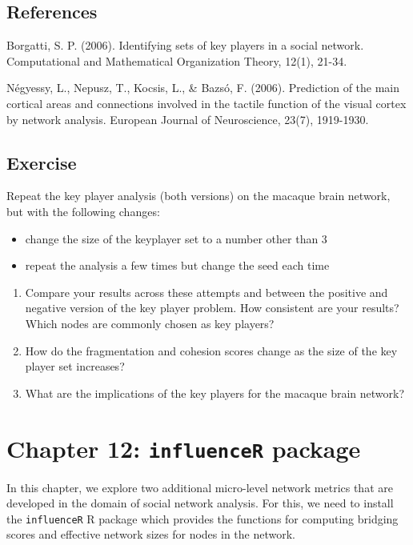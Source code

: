 \documentclass[
]{book}
\providecommand{\tightlist}{%
  \setlength{\itemsep}{0pt}\setlength{\parskip}{0pt}}
\begin{document}
\section{References}\label{references-1}

Borgatti, S. P. (2006). Identifying sets of key players in a social network. Computational and Mathematical Organization Theory, 12(1), 21-34.

Négyessy, L., Nepusz, T., Kocsis, L., \& Bazsó, F. (2006). Prediction of the main cortical areas and connections involved in the tactile function of the visual cortex by network analysis. European Journal of Neuroscience, 23(7), 1919-1930.

\section{Exercise}\label{exercise-7}

Repeat the key player analysis (both versions) on the macaque brain network, but with the following changes:

\begin{itemize}
\tightlist
\item
  change the size of the keyplayer set to a number other than 3
\item
  repeat the analysis a few times but change the seed each time
\end{itemize}

\begin{enumerate}
\def\labelenumi{\arabic{enumi}.}
\tightlist
\item
  Compare your results across these attempts and between the positive and negative version of the key player problem. How consistent are your results? Which nodes are commonly chosen as key players?
\item
  How do the fragmentation and cohesion scores change as the size of the key player set increases?
\item
  What are the implications of the key players for the macaque brain network?
\end{enumerate}

\chapter{\texorpdfstring{Chapter 12: \texttt{influenceR} package}{Chapter 12: influenceR package}}\label{ch12}

In this chapter, we explore two additional micro-level network metrics that are developed in the domain of social network analysis. For this, we need to install the \texttt{influenceR} R package which provides the functions for computing bridging scores and effective network sizes for nodes in the network.
\end{document}
